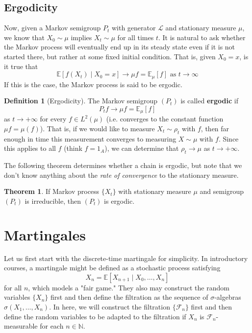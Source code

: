 \documentclass{article}
\theoremstyle{definition}
\newtheorem{theorem}{Theorem}[section]
\theoremstyle{remark}
\theoremstyle{definition}
\newtheorem{definition}{Definition}[section]
\begin{document}
\subsection{Ergodicity}

Now, given a Markov semigroup $P_t$ with generator $\mathscr{L}$ and stationary measure $\mu$, we know that $X_0 \sim \mu$ implies $X_t \sim \mu$ for all times $t$. It is natural to ask whether the Markov process will eventually end up in its steady state even if it is not started there, but rather at some fixed initial condition. That is, given $X_0 = x$, is it true that 
\[\mathbb{E}[f(X_t) \mid X_0 = x] \rightarrow \mu f = \mathbb{E}_\mu [f] \text{ as } t \rightarrow \infty\]
If this is the case, the Markov process is said to be ergodic. 

\begin{definition}[Ergodicity]
The Markov semigroup $(P_t)$ is called \textbf{ergodic} if 
\[P_t f \rightarrow \mu f = \mathbb{E}_\mu [f]\]
as $t \rightarrow +\infty$ for every $f \in L^2 (\mu)$ (i.e. converges to the constant function $\mu f = \mu(f)$). That is, if we would like to measure $X_t \sim \rho_t$ with $f$, then far enough in time this measurement converges to measuring $X \sim \mu$ with $f$. Since this applies to all $f$ (think $f = 1_A$), we can determine that $\rho_t \rightarrow \mu$ as $t \rightarrow +\infty$. 
\end{definition}

The following theorem determines whether a chain is ergodic, but note that we don't know anything about the \textit{rate of convergence} to the stationary measure. 

\begin{theorem}
If Markov process $\{X_t\}$ with stationary measure $\mu$ and semigroup $(P_t)$ is irreducible, then $(P_t)$ is ergodic. 
\end{theorem}

\section{Martingales}

Let us first start with the discrete-time martingale for simplicity. In introductory courses, a martingale might be defined as a stochastic process satisfying 
\[X_n = \mathbb{E}[X_{n+1} \mid X_0, \ldots, X_n]\]
for all $n$, which models a "fair game." They also may construct the random variables $\{X_n\}$ first and then define the filtration as the sequence of $\sigma$-algebras $\sigma(X_1, \ldots, X_n)$. In here, we will construct the filtration $\{\mathcal{F}_n\}$ first and then define the random variables to be adapted to the filtration if $X_n$ is $\mathcal{F}_n$-measurable for each $n \in \mathbb{N}$. 
\end{document}
